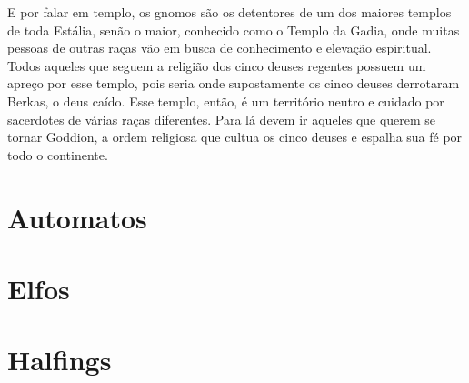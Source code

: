 \documentclass{RPG_Adventure}[2021/10/20]
\begin{document}
\begin{multicols}{2}
E por falar em templo, os gnomos são os detentores de um dos maiores templos de
toda Estália, senão o maior, conhecido como o Templo da Gadia, onde muitas
pessoas de outras raças vão em busca de conhecimento e elevação espiritual.
Todos aqueles que seguem a religião dos cinco deuses regentes possuem um apreço
por esse templo, pois seria onde supostamente os cinco deuses derrotaram Berkas,
o deus caído. Esse templo, então, é um território neutro e cuidado por
sacerdotes de várias raças diferentes. Para lá devem ir aqueles que querem se
tornar Goddion, a ordem religiosa que cultua os cinco deuses e espalha sua fé
por todo o continente.

\section{Automatos}%

\section{Elfos}%

\section{Halfings}%

\end{multicols}

\end{document}
